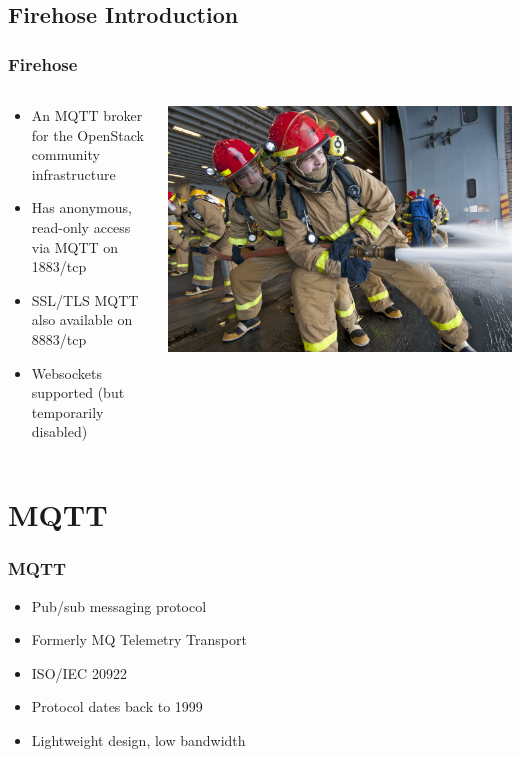 \documentclass[aspectratio=169,11pt,hyperref={colorlinks=true}]{beamer}
\begin{document}
\subsection{Firehose Introduction}
\begin{frame}
	\frametitle{Firehose}
    \begin{columns}[T]
        \begin{column}{.48\textwidth}
            \begin{itemize}
                \item An MQTT broker for the OpenStack community infrastructure
                \item Has anonymous, read-only access via MQTT on 1883/tcp
                \item SSL/TLS MQTT also available on 8883/tcp
                \item Websockets supported (but temporarily disabled)
            \end{itemize}
        \end{column}
        \begin{column}{.48\textwidth}
            \includegraphics[width=\textwidth]{firehose.jpg}
        \end{column}
    \end{columns}
\end{frame}

\section{MQTT}
\begin{frame}
	\frametitle{MQTT}
    \begin{itemize}
        \item Pub/sub messaging protocol
        \item Formerly MQ Telemetry Transport
        \item ISO/IEC 20922
        \item Protocol dates back to 1999
        \item Lightweight design, low bandwidth
    \end{itemize}
\end{frame}
\end{document}
